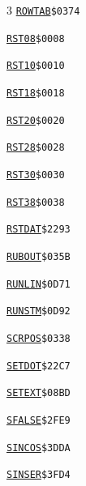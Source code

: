 \begin{multicols}{3}
\noindent\hyperlink{l:ROWTAB}{\texttt{ROWTAB}}\hfill\texttt{\$0374~\phantom{000}\llap{\pageref{l:ROWTAB}}}\par
\noindent\hyperlink{l:RST08}{\texttt{RST08}}\hfill\texttt{\$0008~\phantom{000}\llap{\pageref{l:RST08}}}\par
\noindent\hyperlink{l:RST10}{\texttt{RST10}}\hfill\texttt{\$0010~\phantom{000}\llap{\pageref{l:RST10}}}\par
\noindent\hyperlink{l:RST18}{\texttt{RST18}}\hfill\texttt{\$0018~\phantom{000}\llap{\pageref{l:RST18}}}\par
\noindent\hyperlink{l:RST20}{\texttt{RST20}}\hfill\texttt{\$0020~\phantom{000}\llap{\pageref{l:RST20}}}\par
\noindent\hyperlink{l:RST28}{\texttt{RST28}}\hfill\texttt{\$0028~\phantom{000}\llap{\pageref{l:RST28}}}\par
\noindent\hyperlink{l:RST30}{\texttt{RST30}}\hfill\texttt{\$0030~\phantom{000}\llap{\pageref{l:RST30}}}\par
\noindent\hyperlink{l:RST38}{\texttt{RST38}}\hfill\texttt{\$0038~\phantom{000}\llap{\pageref{l:RST38}}}\par
\noindent\hyperlink{l:RSTDAT}{\texttt{RSTDAT}}\hfill\texttt{\$2293~\phantom{000}\llap{\pageref{l:RSTDAT}}}\par
\noindent\hyperlink{l:RUBOUT}{\texttt{RUBOUT}}\hfill\texttt{\$035B~\phantom{000}\llap{\pageref{l:RUBOUT}}}\par
\noindent\hyperlink{l:RUNLIN}{\texttt{RUNLIN}}\hfill\texttt{\$0D71~\phantom{000}\llap{\pageref{l:RUNLIN}}}\par
\noindent\hyperlink{l:RUNSTM}{\texttt{RUNSTM}}\hfill\texttt{\$0D92~\phantom{000}\llap{\pageref{l:RUNSTM}}}\par
\noindent\hyperlink{l:SCRPOS}{\texttt{SCRPOS}}\hfill\texttt{\$0338~\phantom{000}\llap{\pageref{l:SCRPOS}}}\par
\noindent\hyperlink{l:SETDOT}{\texttt{SETDOT}}\hfill\texttt{\$22C7~\phantom{000}\llap{\pageref{l:SETDOT}}}\par
\noindent\hyperlink{l:SETEXT}{\texttt{SETEXT}}\hfill\texttt{\$08BD~\phantom{000}\llap{\pageref{l:SETEXT}}}\par
\noindent\hyperlink{l:SFALSE}{\texttt{SFALSE}}\hfill\texttt{\$2FE9~\phantom{000}\llap{\pageref{l:SFALSE}}}\par
\noindent\hyperlink{l:SINCOS}{\texttt{SINCOS}}\hfill\texttt{\$3DDA~\phantom{000}\llap{\pageref{l:SINCOS}}}\par
\noindent\hyperlink{l:SINSER}{\texttt{SINSER}}\hfill\texttt{\$3FD4~\phantom{000}\llap{\pageref{l:SINSER}}}\par

\end{multicols}
